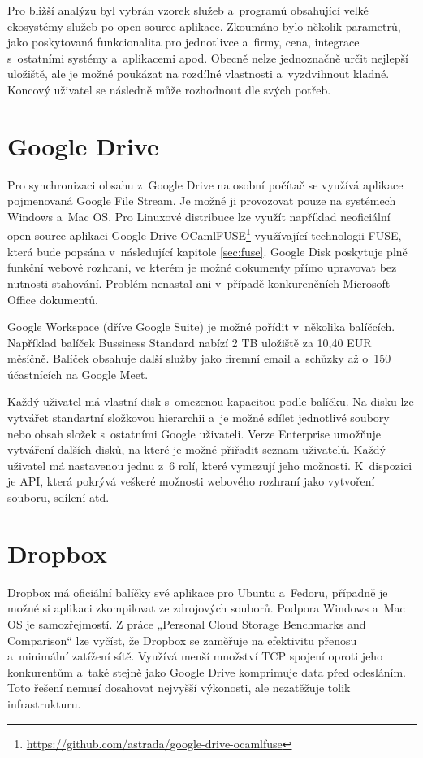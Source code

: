 Pro bližší analýzu byl vybrán vzorek služeb a programů obsahující velké ekosystémy služeb po open source aplikace. Zkoumáno bylo několik parametrů,
jako poskytovaná funkcionalita pro jednotlivce a firmy, cena, integrace s ostatními systémy a aplikacemi apod. Obecně nelze jednoznačně určit nejlepší uložiště, 
ale je možné poukázat na rozdílné vlastnosti a vyzdvihnout kladné. Koncový uživatel se následně může rozhodnout dle svých potřeb.

\section{Google Drive}

Pro synchronizaci obsahu z Google Drive na osobní počítač se využívá aplikace pojmenovaná Google File Stream. Je možné ji provozovat pouze na systémech
Windows a Mac OS. \cite{GoogleFileStream} Pro Linuxové distribuce lze využít například neoficiální open source aplikaci 
Google Drive OCamlFUSE\footnote{\url{https://github.com/astrada/google-drive-ocamlfuse}} využívající technologii
FUSE, která bude popsána v následující kapitole \ref{sec:fuse}. Google Disk poskytuje plně funkční webové rozhraní,
ve kterém je možné dokumenty přímo upravovat bez nutnosti stahování. Problém nenastal ani v případě konkurenčních Microsoft Office dokumentů. 

Google Workspace (dříve Google Suite) je možné pořídit v několika balíčcích. Například balíček Bussiness Standard nabízí 2 TB uložiště za 10,40 EUR měsíčně.
Balíček obsahuje další služby jako firemní email a schůzky až o 150 účastnících na Google Meet. \cite{GoogleWorkspace}

Každý uživatel má vlastní disk s omezenou kapacitou podle balíčku. Na disku lze vytvářet standartní složkovou hierarchii a je možné sdílet jednotlivé soubory nebo
obsah složek s ostatními Google uživateli. Verze Enterprise umožňuje vytváření dalších disků, na které je možné přiřadit seznam uživatelů. Každý uživatel
má nastavenou jednu z 6 rolí, které vymezují jeho možnosti. K dispozici je API, která pokrývá veškeré možnosti webového rozhraní jako vytvoření souboru,
sdílení atd. \cite{GoogleAPIReference}

\section{Dropbox}

Dropbox má oficiální balíčky své aplikace pro Ubuntu a Fedoru, případně je možné si aplikaci zkompilovat ze zdrojových souborů. Podpora Windows a Mac OS je samozřejmostí.
Z práce „Personal Cloud Storage Benchmarks and Comparison“ lze vyčíst, že Dropbox se zaměřuje na efektivitu přenosu a minimální zatížení sítě.
Využívá menší množství TCP spojení oproti jeho konkurentům a také stejně jako Google Drive komprimuje data před odesláním. \cite{CloudStorageComparison}
Toto řešení nemusí dosahovat nejvyšší výkonosti, ale nezatěžuje tolik infrastrukturu. 

